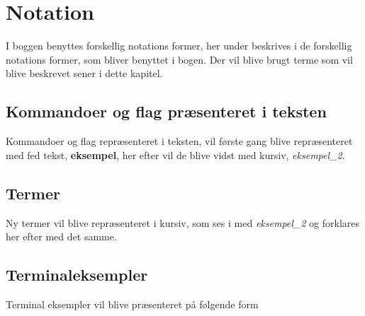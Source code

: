 \section{Notation}
I boggen benyttes forskellig notations former, her under beskrives i de forskellig notations former, som bliver benyttet i bogen. Der vil blive brugt terme som vil blive beskrevet sener i dette kapitel.

\subsection*{Kommandoer og flag præsenteret i teksten}
Kommandoer og flag repræsenteret i teksten, vil første gang blive repræsenteret med fed tekst, \textbf{eksempel}, her efter vil de blive vidst med kursiv, \emph{eksempel\_2}.

\subsection*{Termer}
Ny termer vil blive repræsenteret i kursiv, som ses i med \emph{eksempel\_2} og forklares her efter med det samme.

\subsection*{Terminaleksempler} 
Terminal eksempler vil blive præsenteret på følgende form

